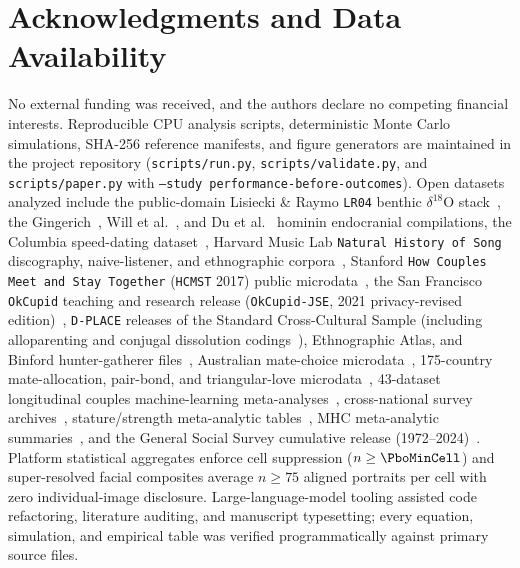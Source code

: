 \documentclass[10pt,journal,twoside]{IEEEtran}
\theoremstyle{plain}
\theoremstyle{remark}
\begin{document}
\section*{Acknowledgments and Data Availability}
{\small\noindent No external funding was received, and the authors declare no competing financial interests. Reproducible CPU analysis scripts, deterministic Monte Carlo simulations, SHA-256 reference manifests, and figure generators are maintained in the project repository (\nolinkurl{scripts/run.py}, \nolinkurl{scripts/validate.py}, and \nolinkurl{scripts/paper.py} with \texttt{--study performance-before-outcomes}). Open datasets analyzed include the public-domain Lisiecki \& Raymo \texttt{LR04} benthic $\delta^{18}\mathrm{O}$ stack~\cite{lisiecki2005}, the Gingerich~\cite{gingerich2022}, Will et al.~\cite{will2021}, and Du et al.~\cite{du2018} hominin endocranial compilations, the Columbia speed-dating dataset~\cite{fisman2006}, Harvard Music Lab \texttt{Natural History of Song} discography, naive-listener, and ethnographic corpora~\cite{mehr2019}, Stanford \texttt{How Couples Meet and Stay Together} (\texttt{HCMST} 2017) public microdata~\cite{rosenfeld2019}, the San Francisco \texttt{OkCupid} teaching and research release (\texttt{OkCupid-JSE}, 2021 privacy-revised edition)~\cite{kim2015}, \texttt{D-PLACE} releases of the Standard Cross-Cultural Sample (including alloparenting and conjugal dissolution codings~\cite{betzig1989}), Ethnographic Atlas, and Binford hunter-gatherer files~\cite{kirby2016,murdock1969,binford2001}, Australian mate-choice microdata~\cite{whyte2021}, 175-country mate-allocation, pair-bond, and triangular-love microdata~\cite{kowal2025}, 43-dataset longitudinal couples machine-learning meta-analyses~\cite{joel2020}, cross-national survey archives~\cite{walter2020}, stature/strength meta-analytic tables~\cite{lidborg2022}, MHC meta-analytic summaries~\cite{havlicek2020,winternitz2017}, and the General Social Survey cumulative release (1972--2024)~\cite{gss2024}. Platform statistical aggregates enforce cell suppression ($n\ge\PboMinCell$) and super-resolved facial composites average $n\ge 75$ aligned portraits per cell with zero individual-image disclosure. Large-language-model tooling assisted code refactoring, literature auditing, and manuscript typesetting; every equation, simulation, and empirical table was verified programmatically against primary source files.\par}

{\footnotesize\setlength{\bibsep}{0.5pt plus 0.3pt}%
}
\end{document}
